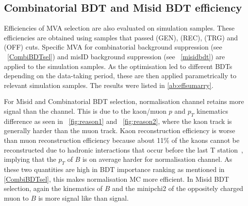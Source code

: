 \subsection{Combinatorial BDT and Misid BDT efficiency}
 Efficiencies of MVA selection are also evaluated on simulation samples. These efficiencies are obtained using samples that passed (GEN), (REC), (TRG) and (OFF) cuts. Specific MVA for combinatorial background suppression (see ~\autoref{CombiBDTsel}) and misID background suppression (see ~\autoref{misidbdt}) are applied to the simulation samples. As the optimisation led to different BDTs depending on the data-taking period, these are then applied parametrically to relevant simulation samples. The results were listed in \autoref{ab:effsumarry}.

For Misid and Combinatorial BDT selection, normalisation \bjpsimumuk channel retains more signal than the \Bmumumu channel. This is due to the kaon/muon $p$ and $p_{T}$ kinematics difference as seen in ~\autoref{fig:reason1} and ~\autoref{fig:reason2}, where the kaon track is generally harder than the muon track. Kaon reconstruction efficiency is worse than muon reconstruction efficiency because about 11\% of the kaons cannot be reconstructed due to hadronic interactions that occur before the last T station~\cite{LHCb-DP-2013-002}, implying that the $p_{T}$ of $B$ is on average harder for normalisation channel. As these two quantities are high in BDT importance ranking as mentioned in \autoref{CombiBDTsel}, this makes normalisation MC more efficient. In Misid BDT selection, again the kinematics of $B$ and the \gls{minipchi2} of the oppositely charged muon to $B$ is more signal like than signal.



